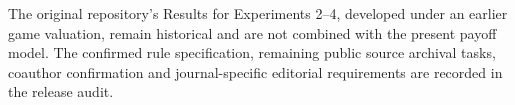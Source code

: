 \documentclass[10pt,a4paper]{article}
\begin{document}
The original repository's Results for Experiments 2--4, developed under an earlier game valuation, remain historical and are not combined with the present payoff model. The confirmed rule specification, remaining public source archival tasks, coauthor confirmation and journal-specific editorial requirements are recorded in the release audit.
\end{document}
